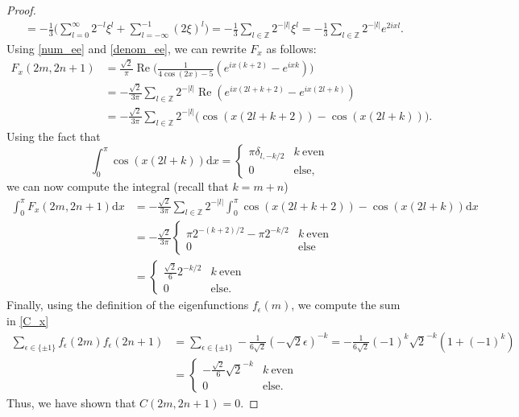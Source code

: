 \documentclass[11pt]{amsart}
\newcommand{\Z}{\mathbb{Z}}
\theoremstyle{definition}
\theoremstyle{remark}
\theoremstyle{plain}
\numberwithin{equation}{section}
\numberwithin{lemma}{section}
\numberwithin{definition}{section}
\numberwithin{proposition}{section}
\numberwithin{corollary}{section}
\numberwithin{theorem}{section}
\numberwithin{remark}{section}
\begin{document}
\begin{proof}
\begin{align}
&=-\frac{1}{3}\Big(\sum_{l=0}^{\infty}2^{-l}\xi^l + \sum_{l=-\infty}^{-1} (2\xi)^l \Big) 
=-\frac{1}{3} \sum_{l\in\Z}2^{-|l|}\xi^l=-\frac{1}{3} \sum_{l\in\Z}2^{-|l|}e^{2ixl}. \label{denom_ee}
\end{align}
Using \eqref{num_ee} and \eqref{denom_ee}, we can rewrite $F_x$ as follows:
\begin{align*}
 F_x(2m,2n+1)
 &=\frac{\sqrt{2}}{\pi} \operatorname{Re}\Big(\frac{1}{4\cos(2x)-5}(e^{ix(k+2)}-e^{ixk})\Big) \\
 &=-\frac{\sqrt{2}}{3\pi} \sum_{l\in\Z}2^{-|l|} \operatorname{Re}(e^{ix(2l+k+2)}-e^{ix(2l+k)}) \\
 &=-\frac{\sqrt{2}}{3\pi} \sum_{l\in\Z}2^{-|l|} \big( \cos(x(2l+k+2))-\cos(x(2l+k)) \big).
\end{align*}
Using the fact that 
$$
\int_0^\pi \cos(x(2l+k)) \mathrm{d}x =
\begin{cases}
\pi \delta_{l,-k/2} & k \ \text{even} \\
0 & \text{else},
\end{cases}
$$
we can now compute the integral (recall that $k=m+n$)
\begin{align*}
 \int_0^\pi F_x(2m,2n+1) \mathrm{d}x & =-\frac{\sqrt{2}}{3\pi} \sum_{l\in\Z}2^{-|l|} \int_0^\pi \cos(x(2l+k+2))-\cos(x(2l+k)) \mathrm{d}x \\
 &= -\frac{\sqrt{2}}{3\pi}
\begin{cases}
 \pi 2^{-(k+2)/2} - \pi 2^{-k/2} & k \ \text{even} \\
 0 & \text{else}
\end{cases}
\\
&= 
\begin{cases}
\frac{\sqrt{2}}{6} 2^{-k/2}  & k \ \text{even} \\
 0 & \text{else}.
 \end{cases}
\end{align*}
Finally, using the definition of the eigenfunctions $f_\epsilon(m)$, we compute the sum in \eqref{C_x}
\begin{align*}
 \sum_{\epsilon\in\{\pm1\}}f_\epsilon(2m)f_\epsilon(2n+1) & =\sum_{\epsilon\in\{\pm1\}}-\frac{1}{6\sqrt{2}}(-\sqrt{2}\epsilon)^{-k}=-\frac{1}{6\sqrt{2}}(-1)^k\sqrt{2}^{-k}(1+(-1)^k) \\
 &=
 \begin{cases}
  -\frac{\sqrt{2}}{6}\sqrt{2}^{-k} & k \ \text{even} \\
 0 & \text{else}.
\end{cases}
\end{align*}
Thus, we have shown that $C(2m,2n+1)= 0$.
\end{proof}
\end{document}
